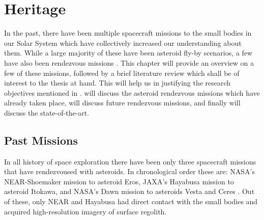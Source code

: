 \chapter{Heritage}
\label{chap:heritage}
\graphicspath{{Mission_Heritage/Images/}}

In the past, there have been multiple spacecraft missions to the small bodies in our Solar System which have collectively increased our understanding about them. While a large majority of these have been asteroid fly-by scenarios, a few have also been rendezvous missions \parencite{esa_mission2asteroids_web}. This chapter will provide an overview on a few of these missions, followed by a brief literature review which shall be of interest to the thesis at hand. This will help us in justifying the research objectives mentioned in .  will discuss the asteroid rendezvous missions which have already taken place,  will discuss future rendezvous missions, and finally  will discuss the state-of-the-art.

\section{Past Missions}
\label{sec:past_missions}
In all history of space exploration there have been only three spacecraft missions that have rendezvoused with asteroids. In chronological order these are: \gls{NASA}'s \gls{NEAR}-Shoemaker mission to asteroid Eros, \gls{JAXA}'s Hayabusa mission to asteroid Itokawa, and \gls{NASA}'s Dawn mission to asteroids Vesta and Ceres \parencite{scheeresBook}. Out of these, only \gls{NEAR} and Hayabusa had direct contact with the small bodies and acquired high-resolution imagery of surface regolith.

